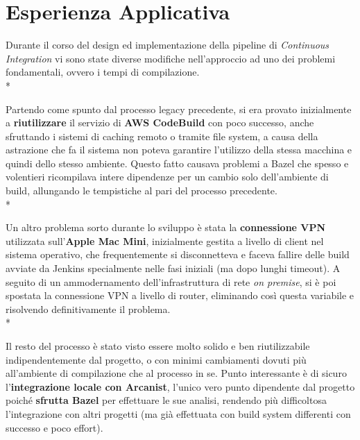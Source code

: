 \documentclass[../main.tex]{subfiles}
\begin{document}
        \section{Esperienza Applicativa}

            Durante il corso del design ed implementazione della pipeline di \emph{Continuous Integration} vi sono state diverse modifiche nell'approccio ad uno dei problemi fondamentali, ovvero i tempi di compilazione.\\*
            
            Partendo come spunto dal processo legacy precedente, si era provato inizialmente a \textbf{riutilizzare} il servizio di \textbf{AWS CodeBuild} con poco successo, anche sfruttando i sistemi di caching remoto o tramite file system, a causa della astrazione che fa il sistema non poteva garantire l'utilizzo della stessa macchina e quindi dello stesso ambiente. Questo fatto causava problemi a Bazel che spesso e volentieri ricompilava intere dipendenze per un cambio solo dell'ambiente di build, allungando le tempistiche al pari del processo precedente.\\*
            
            Un altro problema sorto durante lo sviluppo è stata la \textbf{connessione VPN} utilizzata sull'\textbf{Apple Mac Mini}, inizialmente gestita a livello di client nel sistema operativo, che frequentemente si disconnetteva e faceva fallire delle build avviate da Jenkins specialmente nelle fasi iniziali (ma dopo lunghi timeout). A seguito di un ammodernamento dell'infrastruttura di rete \emph{on premise}, si è poi spostata la connessione VPN a livello di router, eliminando così questa variabile e risolvendo definitivamente il problema.\\*
            
            Il resto del processo è stato visto essere molto solido e ben riutilizzabile indipendentemente dal progetto, o con minimi cambiamenti dovuti più all'ambiente di compilazione che al processo in se. Punto interessante è di sicuro l'\textbf{integrazione locale con Arcanist}, l'unico vero punto dipendente dal progetto poiché \textbf{sfrutta Bazel} per effettuare le sue analisi, rendendo più difficoltosa l'integrazione con altri progetti (ma già effettuata con build system differenti con successo e poco effort).
\end{document}
